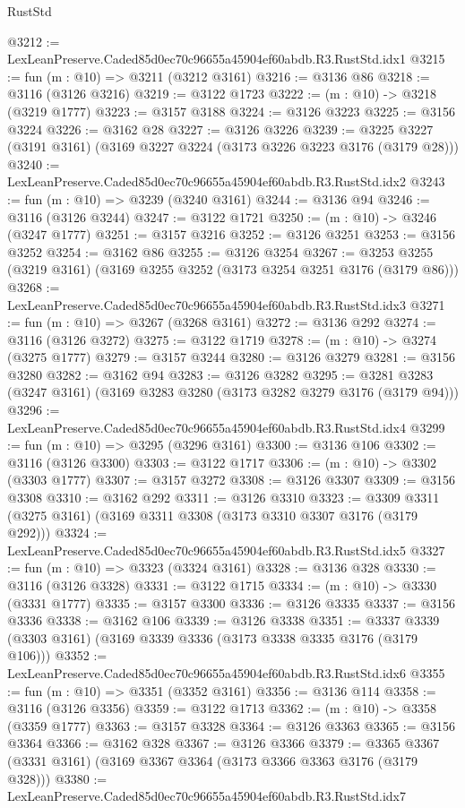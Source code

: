 \begin{lexlean}{RustStd}
\begin{coremodule}
@3212 := LexLeanPreserve.Caded85d0ec70c96655a45904ef60abdb.R3.RustStd.idx1
@3215 := fun (m : @10) => @3211 (@3212 @3161)
@3216 := @3136 @86
@3218 := @3116 (@3126 @3216)
@3219 := @3122 @1723
@3222 := (m : @10) -> @3218 (@3219 @1777)
@3223 := @3157 @3188
@3224 := @3126 @3223
@3225 := @3156 @3224
@3226 := @3162 @28
@3227 := @3126 @3226
@3239 := @3225 @3227 (@3191 @3161) (@3169 @3227 @3224 (@3173 @3226 @3223 @3176 (@3179 @28)))
@3240 := LexLeanPreserve.Caded85d0ec70c96655a45904ef60abdb.R3.RustStd.idx2
@3243 := fun (m : @10) => @3239 (@3240 @3161)
@3244 := @3136 @94
@3246 := @3116 (@3126 @3244)
@3247 := @3122 @1721
@3250 := (m : @10) -> @3246 (@3247 @1777)
@3251 := @3157 @3216
@3252 := @3126 @3251
@3253 := @3156 @3252
@3254 := @3162 @86
@3255 := @3126 @3254
@3267 := @3253 @3255 (@3219 @3161) (@3169 @3255 @3252 (@3173 @3254 @3251 @3176 (@3179 @86)))
@3268 := LexLeanPreserve.Caded85d0ec70c96655a45904ef60abdb.R3.RustStd.idx3
@3271 := fun (m : @10) => @3267 (@3268 @3161)
@3272 := @3136 @292
@3274 := @3116 (@3126 @3272)
@3275 := @3122 @1719
@3278 := (m : @10) -> @3274 (@3275 @1777)
@3279 := @3157 @3244
@3280 := @3126 @3279
@3281 := @3156 @3280
@3282 := @3162 @94
@3283 := @3126 @3282
@3295 := @3281 @3283 (@3247 @3161) (@3169 @3283 @3280 (@3173 @3282 @3279 @3176 (@3179 @94)))
@3296 := LexLeanPreserve.Caded85d0ec70c96655a45904ef60abdb.R3.RustStd.idx4
@3299 := fun (m : @10) => @3295 (@3296 @3161)
@3300 := @3136 @106
@3302 := @3116 (@3126 @3300)
@3303 := @3122 @1717
@3306 := (m : @10) -> @3302 (@3303 @1777)
@3307 := @3157 @3272
@3308 := @3126 @3307
@3309 := @3156 @3308
@3310 := @3162 @292
@3311 := @3126 @3310
@3323 := @3309 @3311 (@3275 @3161) (@3169 @3311 @3308 (@3173 @3310 @3307 @3176 (@3179 @292)))
@3324 := LexLeanPreserve.Caded85d0ec70c96655a45904ef60abdb.R3.RustStd.idx5
@3327 := fun (m : @10) => @3323 (@3324 @3161)
@3328 := @3136 @328
@3330 := @3116 (@3126 @3328)
@3331 := @3122 @1715
@3334 := (m : @10) -> @3330 (@3331 @1777)
@3335 := @3157 @3300
@3336 := @3126 @3335
@3337 := @3156 @3336
@3338 := @3162 @106
@3339 := @3126 @3338
@3351 := @3337 @3339 (@3303 @3161) (@3169 @3339 @3336 (@3173 @3338 @3335 @3176 (@3179 @106)))
@3352 := LexLeanPreserve.Caded85d0ec70c96655a45904ef60abdb.R3.RustStd.idx6
@3355 := fun (m : @10) => @3351 (@3352 @3161)
@3356 := @3136 @114
@3358 := @3116 (@3126 @3356)
@3359 := @3122 @1713
@3362 := (m : @10) -> @3358 (@3359 @1777)
@3363 := @3157 @3328
@3364 := @3126 @3363
@3365 := @3156 @3364
@3366 := @3162 @328
@3367 := @3126 @3366
@3379 := @3365 @3367 (@3331 @3161) (@3169 @3367 @3364 (@3173 @3366 @3363 @3176 (@3179 @328)))
@3380 := LexLeanPreserve.Caded85d0ec70c96655a45904ef60abdb.R3.RustStd.idx7

\end{coremodule}
\end{lexlean}
